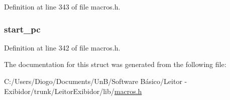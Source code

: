 Definition at line 343 of file macros.\+h.

\hypertarget{struct_line__number__table_a3ded0b47a89e0816c20dc577a82a1cd5}{}
\subsubsection[{start\+\_\+pc}]{ start\+\_\+pc}\label{struct_line__number__table_a3ded0b47a89e0816c20dc577a82a1cd5}


Definition at line 342 of file macros.\+h.



The documentation for this struct was generated from the following file\+:\begin{DoxyCompactItemize}
\item 
C\+:/\+Users/\+Diogo/\+Documents/\+Un\+B/\+Software Básico/\+Leitor -\/ Exibidor/trunk/\+Leitor\+Exibidor/lib/\hyperlink{macros_8h}{macros.\+h}\end{DoxyCompactItemize}
